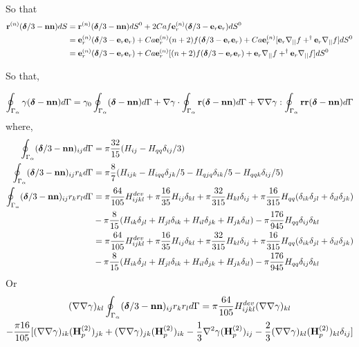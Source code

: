 So that 
\begin{align}
    \textbf{r}^{(n)}(\bm\delta/3 - \textbf{nn}) dS
    &= 
    \textbf{r}^{(n)}(\bm\delta/3 - \textbf{nn}) dS^0 
    + 2 Ca f \textbf{e}^{(n)}_r(\bm\delta/3 - \textbf{e}_r \textbf{e}_r)  dS^0 \\
    &=
    \textbf{e}_r^{(n)}(\bm\delta/3
    - \textbf{e}_r\textbf{e}_r)
    + Ca  \textbf{e}_r^{(n)} (n+2) f (\bm\delta/3 - \textbf{e}_r\textbf{e}_r)
    + Ca \textbf{e}_r^{(n)} [
        \textbf{e}_r \mathbf{\nabla}_{||} f
        + ^\dagger \textbf{e}_r \mathbf{\nabla}_{||} f
    ] dS^0 \\
    &=
    \textbf{e}_r^{(n)}(\bm\delta/3
    - \textbf{e}_r\textbf{e}_r)
    + Ca \textbf{e}_r^{(n)}
    [(n+2) f (\bm\delta/3 - \textbf{e}_r\textbf{e}_r)
    + \textbf{e}_r \mathbf{\nabla}_{||} f
    + ^\dagger \textbf{e}_r \mathbf{\nabla}_{||} f
    ] dS^0 \\
\end{align}


So that,

\begin{equation}
    \oint_{\Gamma_{\alpha}} \gamma (\bm\delta - \textbf{nn}) d\Gamma
    =
    \gamma_0 \oint_{\Gamma_{\alpha}}  (\bm\delta - \textbf{nn}) d\Gamma
    + \mathbf{\nabla}\gamma \cdot \oint_{\Gamma_{\alpha}} \textbf{r} (\bm\delta - \textbf{nn}) d\Gamma
    + \mathbf{\nabla}\mathbf{\nabla}\gamma : \oint_{\Gamma_{\alpha}} \textbf{rr} (\bm\delta - \textbf{nn}) d\Gamma
\end{equation}
where, 
\begin{align*}
    \oint_{\Gamma_{\alpha}}  (\bm\delta/3 - \textbf{nn})_{ij} d\Gamma &= \pi\frac{32}{15} (H_{ij}- H_{qq} \delta_{ij}/3)\\
    \oint_{\Gamma_{\alpha}}  (\bm\delta/3 - \textbf{nn})_{ij}r_k d\Gamma &= \pi\frac{8}{7} (H_{ijk} - H_{iqq} \delta_{jk}/5- H_{qjq} \delta_{ik}/5- H_{qqk} \delta_{ij}/5)\\
    \oint_{\Gamma_{\alpha}}  (\bm\delta/3 - \textbf{nn})_{ij}r_kr_l d\Gamma &= 
    \pi\frac{64}{105} H_{ijkl}^{dev} 
    + \pi\frac{16}{35} H_{ij}\delta_{kl}
    + \pi\frac{32}{315} H_{kl}\delta_{ij}
    + \pi\frac{16}{315} H_{qq}(\delta_{ik}\delta_{jl}+\delta_{il}\delta_{jk})\\
    &- \pi\frac{8}{15} (H_{ik}\delta_{jl}+ H_{jl}\delta_{ik}+H_{il}\delta_{jk}+H_{jk}\delta_{il})
    - \pi\frac{176}{945} H_{qq}\delta_{ij}\delta_{kl}\\
    &=\pi\frac{64}{105} H_{ijkl}^{dev} 
    + \pi\frac{16}{35} H_{ij}\delta_{kl}
    + \pi\frac{32}{315} H_{kl}\delta_{ij}
    + \pi\frac{16}{315} H_{qq}(\delta_{ik}\delta_{jl}+\delta_{il}\delta_{jk})\\
    &- \pi\frac{8}{15} (H_{ik}\delta_{jl}+ H_{jl}\delta_{ik}+H_{il}\delta_{jk}+H_{jk}\delta_{il})
    - \pi\frac{176}{945} H_{qq}\delta_{ij}\delta_{kl}\\
\end{align*}
Or 
\begin{multline*}
    (\mathbf{\nabla}\mathbf{\nabla} \gamma )_{kl}
    \oint_{\Gamma_{\alpha}}  (\bm\delta/3 - \textbf{nn})_{ij}r_kr_l d\Gamma
    =
    \pi\frac{64}{105} H_{ijkl}^{dev} (\mathbf{\nabla}\mathbf{\nabla} \gamma)_{kl}\\
    -\frac{\pi 16}{105} [
        (\mathbf{\nabla}\mathbf{\nabla} \gamma)_{ik} (\textbf{H}_p^{(2)})_{jk}
        + (\mathbf{\nabla}\mathbf{\nabla} \gamma)_{jk} (\textbf{H}_p^{(2)})_{ik}
        -\frac{1}{3}\mathbf{\nabla}^2 \gamma (\textbf{H}_p^{(2)})_{ij}
        -\frac{2}{3}(\mathbf{\nabla}\mathbf{\nabla} \gamma)_{kl} (\textbf{H}_p^{(2)})_{kl}\delta_{ij}
        ]
\end{multline*}
